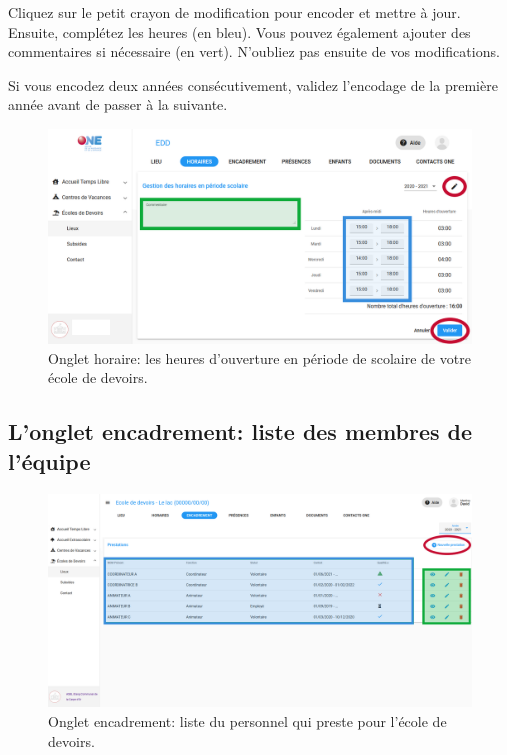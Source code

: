Cliquez sur le petit crayon de modification pour encoder et mettre à jour. Ensuite, complétez les heures (en bleu). Vous pouvez également ajouter des commentaires si nécessaire (en vert). N'oubliez pas ensuite de  vos modifications. 

\begin{info}
Si vous encodez deux années consécutivement, validez l'encodage de la première année avant de passer à la suivante.
\end{info}
 

\begin{figure}[htbp]
    \centering
    \includegraphics[width=14cm]{Images/edd/edd-horaires.png}
    \caption{Onglet horaire: les heures d'ouverture en période de scolaire de votre école de devoirs.}
    \label{fig:edd_horaires}
\end{figure}

    
\subsection{L'onglet encadrement: liste des membres de l'équipe}

\begin{figure}[htbp]
    \centering
    \includegraphics[width=15cm]{Images/edd/encadrement.png}
    \caption{Onglet encadrement: liste du personnel qui preste pour l'école de devoirs.}
    \label{fig:edd_encadrement}
\end{figure}


